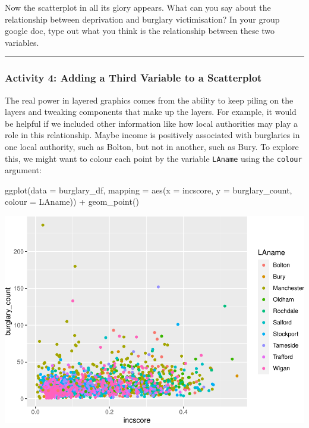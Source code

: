 \documentclass[
]{book}
\newenvironment{Shaded}{\begin{snugshade}}{\end{snugshade}}
\newcommand{\AttributeTok}[1]{\textcolor[rgb]{0.77,0.63,0.00}{#1}}
\newcommand{\FunctionTok}[1]{\textcolor[rgb]{0.00,0.00,0.00}{#1}}
\newcommand{\NormalTok}[1]{#1}
\newcommand{\SpecialCharTok}[1]{\textcolor[rgb]{0.00,0.00,0.00}{#1}}
\begin{document}
Now the scatterplot in all its glory appears. What can you say about the relationship between deprivation and burglary victimisation? In your group google doc, type out what you think is the relationship between these two variables.

\begin{center}\rule{0.5\linewidth}{0.5pt}\end{center}

\hypertarget{activity-4-adding-a-third-variable-to-a-scatterplot}{%
\subsubsection{Activity 4: Adding a Third Variable to a Scatterplot}\label{activity-4-adding-a-third-variable-to-a-scatterplot}}

The real power in layered graphics comes from the ability to keep piling on the layers and tweaking components that make up the layers. For example, it would be helpful if we included other information like how local authorities may play a role in this relationship. Maybe income is positively associated with burglaries in one local authority, such as Bolton, but not in another, such as Bury. To explore this, we might want to colour each point by the variable \texttt{LAname} using the \texttt{colour} argument:

\begin{Shaded}
\begin{Highlighting}[]
\FunctionTok{ggplot}\NormalTok{(}\AttributeTok{data =}\NormalTok{ burglary\_df, }\AttributeTok{mapping =} \FunctionTok{aes}\NormalTok{(}\AttributeTok{x =}\NormalTok{ incscore, }\AttributeTok{y =}\NormalTok{ burglary\_count, }\AttributeTok{colour =}\NormalTok{ LAname)) }\SpecialCharTok{+} 
  \FunctionTok{geom\_point}\NormalTok{()}
\end{Highlighting}
\end{Shaded}

\includegraphics{03-data-visualisation_files/figure-latex/unnamed-chunk-7-1.pdf}
\end{document}
